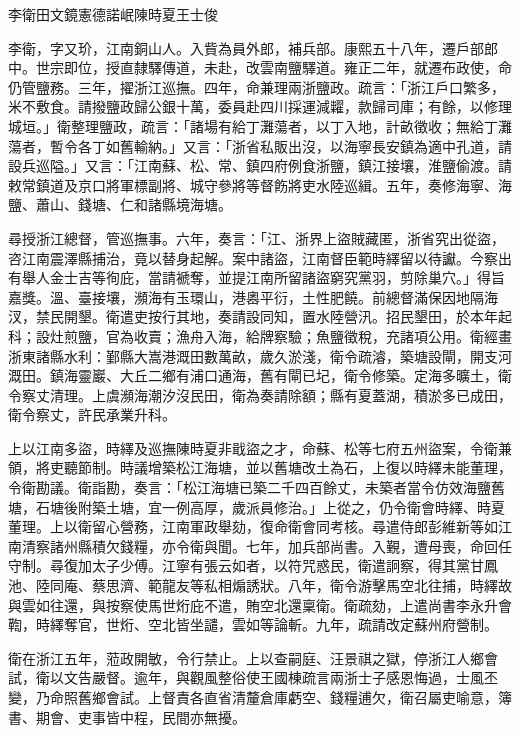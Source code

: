 
\begin{pinyinscope}
李衛田文鏡憲德諾岷陳時夏王士俊

李衛，字又玠，江南銅山人。入貲為員外郎，補兵部。康熙五十八年，遷戶部郎中。世宗即位，授直隸驛傳道，未赴，改雲南鹽驛道。雍正二年，就遷布政使，命仍管鹽務。三年，擢浙江巡撫。四年，命兼理兩浙鹽政。疏言：「浙江戶口繁多，米不敷食。請撥鹽政歸公銀十萬，委員赴四川採運減糶，款歸司庫；有餘，以修理城垣。」衛整理鹽政，疏言：「諸場有給丁灘蕩者，以丁入地，計畝徵收；無給丁灘蕩者，暫令各丁如舊輸納。」又言：「浙省私販出沒，以海寧長安鎮為適中孔道，請設兵巡隘。」又言：「江南蘇、松、常、鎮四府例食浙鹽，鎮江接壤，淮鹽偷渡。請敕常鎮道及京口將軍標副將、城守參將等督飭將吏水陸巡緝。五年，奏修海寧、海鹽、蕭山、錢塘、仁和諸縣境海塘。

尋授浙江總督，管巡撫事。六年，奏言：「江、浙界上盜賊藏匿，浙省究出從盜，咨江南震澤縣捕治，竟以替身起解。案中諸盜，江南督臣範時繹留以待讞。今察出有舉人金士吉等徇庇，當請褫奪，並提江南所留諸盜窮究黨羽，剪除巢穴。」得旨嘉獎。溫、臺接壤，瀕海有玉環山，港嶴平衍，土性肥饒。前總督滿保因地隔海汊，禁民開墾。衛遣吏按行其地，奏請設同知，置水陸營汛。招民墾田，於本年起科；設灶煎鹽，官為收賣；漁舟入海，給牌察驗；魚鹽徵稅，充諸項公用。衛經畫浙東諸縣水利：鄞縣大嵩港溉田數萬畝，歲久淤淺，衛令疏濬，築塘設閘，開支河溉田。鎮海靈巖、大丘二鄉有浦口通海，舊有閘已圮，衛令修築。定海多曠土，衛令察丈清理。上虞瀕海潮汐沒民田，衛為奏請除額；縣有夏蓋湖，積淤多已成田，衛令察丈，許民承業升科。

上以江南多盜，時繹及巡撫陳時夏非戢盜之才，命蘇、松等七府五州盜案，令衛兼領，將吏聽節制。時議增築松江海塘，並以舊塘改土為石，上復以時繹未能董理，令衛勘議。衛詣勘，奏言：「松江海塘已築二千四百餘丈，未築者當令仿效海鹽舊塘，石塘後附築土塘，宜一例高厚，歲派員修治。」上從之，仍令衛會時繹、時夏董理。上以衛留心營務，江南軍政舉劾，復命衛會同考核。尋遣侍郎彭維新等如江南清察諸州縣積欠錢糧，亦令衛與聞。七年，加兵部尚書。入覲，遭母喪，命回任守制。尋復加太子少傅。江寧有張云如者，以符咒惑民，衛遣詗察，得其黨甘鳳池、陸同庵、蔡思濟、範龍友等私相煽誘狀。八年，衛令游擊馬空北往捕，時繹故與雲如往還，與按察使馬世烆庇不遣，賄空北還稟衛。衛疏劾，上遣尚書李永升會鞫，時繹奪官，世烆、空北皆坐譴，雲如等論斬。九年，疏請改定蘇州府營制。

衛在浙江五年，蒞政開敏，令行禁止。上以查嗣庭、汪景祺之獄，停浙江人鄉會試，衛以文告嚴督。逾年，與觀風整俗使王國棟疏言兩浙士子感恩悔過，士風丕變，乃命照舊鄉會試。上督責各直省清釐倉庫虧空、錢糧逋欠，衛召屬吏喻意，簿書、期會、吏事皆中程，民間亦無擾。


\end{pinyinscope}
